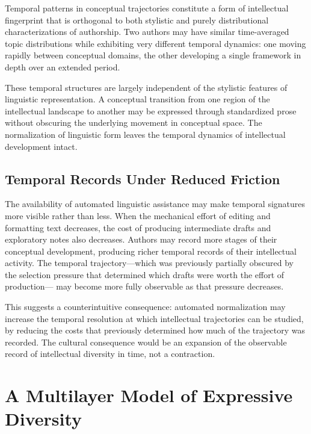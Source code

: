 \documentclass[12pt,a4paper]{article}
\theoremstyle{definition}
\theoremstyle{plain}
\theoremstyle{remark}
\begin{document}
Temporal patterns in conceptual trajectories constitute a form of intellectual fingerprint
that is orthogonal to both stylistic and purely distributional characterizations of
authorship. Two authors may have similar time-averaged topic distributions while exhibiting
very different temporal dynamics: one moving rapidly between conceptual domains, the other
developing a single framework in depth over an extended period.

These temporal structures are largely independent of the stylistic features of linguistic
representation. A conceptual transition from one region of the intellectual landscape to
another may be expressed through standardized prose without obscuring the underlying
movement in conceptual space. The normalization of linguistic form leaves the temporal
dynamics of intellectual development intact.

\subsection{Temporal Records Under Reduced Friction}

The availability of automated linguistic assistance may make temporal signatures more visible
rather than less. When the mechanical effort of editing and formatting text decreases, the
cost of producing intermediate drafts and exploratory notes also decreases. Authors may
record more stages of their conceptual development, producing richer temporal records of
their intellectual activity. The temporal trajectory---which was previously partially obscured
by the selection pressure that determined which drafts were worth the effort of production---
may become more fully observable as that pressure decreases.

This suggests a counterintuitive consequence: automated normalization may increase the
temporal resolution at which intellectual trajectories can be studied, by reducing the costs
that previously determined how much of the trajectory was recorded. The cultural consequence
would be an expansion of the observable record of intellectual diversity in time, not a
contraction.

\section{A Multilayer Model of Expressive Diversity}
\label{sec:multilayer}
\end{document}
